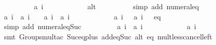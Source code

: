 \begin{isabellebody}
\ \ \ \ \ \ \isamarkupfalse%
\ \isamarkupfalse%
\ {\isachardoublequoteopen}{\isacharquery}a\ {\isacharparenleft}i{\isacharplus}{}{\isacharparenright}\ {\isachargreater}\ {}{\isachardoublequoteclose}\isanewline
\ \ \ \ \ \ \ \ \isamarkupfalse%
\ alt\isanewline
\ \ \ \ \ \ \ \ \isamarkupfalse%
\ {\isacharparenleft}simp\ add{\isacharcolon}\ numeral{\isacharunderscore}{}{\isacharunderscore}eq{\isacharunderscore}{}{\isacharparenright}\isanewline
\ \ \ \ \ \ \isamarkupfalse%
\ {\isachardoublequoteopen}{\isacharquery}a\ i\ {\isacharasterisk}\ {\isacharquery}a\ {\isacharparenleft}i{\isacharplus}{}{\isacharparenright}\ {\isacharplus}\ {}\ {\isacharless}\ {\isacharquery}a\ {\isacharparenleft}i{\isacharplus}{}{\isacharparenright}\ {\isacharasterisk}\ {\isacharquery}a\ {\isacharparenleft}i{\isacharplus}{}{\isacharparenright}\ {\isacharplus}\ {}{\isachardoublequoteclose}\isanewline
\ \ \ \ \ \ \ \ \isamarkupfalse%
\ {\isacharbackquoteopen}{\isacharquery}a\ {\isacharparenleft}i{\isacharplus}{}{\isacharparenright}\ {\isacharless}\ {}{\isacharbackquoteclose}\ {\isacharbackquoteopen}{\isacharquery}a\ {\isacharparenleft}i{\isacharplus}{}{\isacharparenright}\ {\isachargreater}\ {}{\isacharbackquoteclose}\ eq\isanewline
\ \ \ \ \ \ \ \ \isamarkupfalse%
\ {\isacharparenleft}simp\ add{\isacharcolon}\ numeral{\isacharunderscore}eq{\isacharunderscore}Suc{\isacharparenright}\isanewline
\ \ \ \ \ \ \isamarkupfalse%
\ \isamarkupfalse%
\ {\isachardoublequoteopen}{\isacharquery}a\ i\ {\isacharless}\ {\isacharquery}a\ {\isacharparenleft}i\ {\isacharplus}\ {}{\isacharparenright}{\isachardoublequoteclose}\isanewline
\ \ \ \ \ \ \ \ \isamarkupfalse%
\ {\isacharbackquoteopen}{\isacharquery}a\ {\isacharparenleft}i\ {\isacharplus}\ {}{\isacharparenright}\ {\isachargreater}\ {}{\isacharbackquoteclose}\isanewline
\ \ \ \ \ \ \ \ \isamarkupfalse%
\ {\isacharparenleft}smt\ Groups{\isachardot}mult{\isacharunderscore}ac{\isacharparenleft}{}{\isacharparenright}\ Suc{\isacharunderscore}eq{\isacharunderscore}plus{}\ add{\isacharunderscore}{}{\isacharunderscore}eq{\isacharunderscore}Suc{\isacharprime}\ alt\ eq\ mult{\isacharunderscore}less{\isacharunderscore}cancel{\isacharunderscore}left{}{\isacharparenright}\isanewline

\end{isabellebody}
